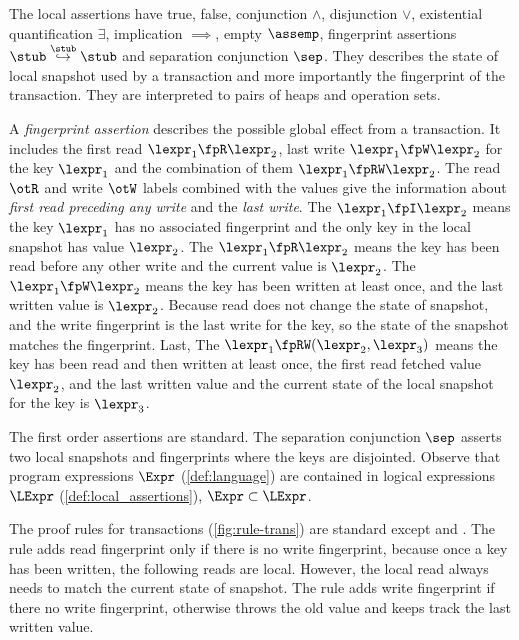 The local assertions have true, false, conjunction \( \land \), disjunction \( \lor \), existential quantification \( \exists \), implication \( \implies  \), empty \( \assemp \), fingerprint assertions \( \stub \stackrel{\stub}{\hookrightarrow} \stub \) and separation conjunction \( \sep \).
They describes the state of local snapshot used by a transaction and more importantly the fingerprint of the transaction.
They are interpreted to pairs of heaps and operation sets.

A \emph{fingerprint assertion} describes the possible global effect from a transaction.
It includes the first read \( \lexpr_{1} \fpR \lexpr_{2} \), last write \( \lexpr_{1} \fpW \lexpr_{2} \) for the key \( \lexpr_{1} \) and the combination of them \( \lexpr_{1} \fpRW \lexpr_{2} \).
The read \( \otR \) and write \( \otW \) labels combined with the values give the information about \emph{first read preceding any write} and the \emph{last write}.
The \( \lexpr_{1} \fpI \lexpr_{2} \) means the key \( \lexpr_{1} \) has no associated fingerprint and the only key in the local snapshot has value \( \lexpr_{2} \).
The \( \lexpr_{1} \fpR \lexpr_{2} \) means the key has been read before any other write and the current value is \( \lexpr_{2} \).
The \( \lexpr_{1} \fpW \lexpr_{2} \) means the key has been written at least once, and the last written value is \( \lexpr_{2} \).
Because read does not change the state of snapshot, and the write fingerprint is the last write for the key, so the state of the snapshot matches the fingerprint.
Last, The \( \lexpr_{1} \fpRW (\lexpr_{2}, \lexpr_{3}) \) means the key has been read and then written at least once, the first read fetched value \( \lexpr_{2} \), and the last written value and the current state of the local snapshot for the key is \( \lexpr_{3} \).

The first order assertions are standard.
The separation conjunction \( \sep \) asserts two local snapshots and fingerprints where the keys are disjointed.
Observe that program expressions $\Expr$ (\cref{def:language}) are contained in logical expressions $\LExpr$ (\cref{def:local_assertions}), \ie $\Expr \subset \LExpr$. 

The proof rules for transactions (\cref{fig:rule-trans}) are standard except  and .
The  rule adds read fingerprint only if there is no write fingerprint, because once a key has been written, the following reads are local.
However, the local read always needs to match the current state of snapshot.
The rule adds write fingerprint if there no write fingerprint, otherwise throws the old value and keeps track the last written value.

